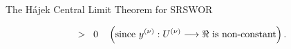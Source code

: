 \begin{frame}{\large The H\'ajek Central Limit Theorem for SRSWOR}
{\begin{itemize}
\begin{equation*}
\;\; > \;\; 0
\quad\left(\textnormal{since $y^{(\nu)} : U^{(\nu)} \longrightarrow \Re$ is non-constant}\right).
\end{equation*}
\end{itemize}
}

\end{frame}

